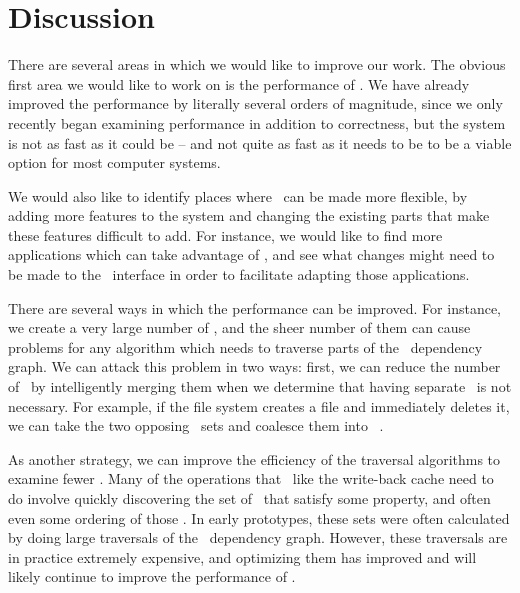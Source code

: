 \section {Discussion}
\label{sec:discussion}

There are several areas in which we would like to improve our work. The obvious
first area we would like to work on is the performance of \Kudos. We have
already improved the performance by literally several orders of magnitude, since
we only recently began examining performance in addition to correctness, but the
system is not as fast as it could be -- and not quite as fast as it needs to be
to be a viable option for most computer systems.

We would also like to identify places where \Kudos\ can be made more flexible,
by adding more features to the system and changing the existing parts that make
these features difficult to add. For instance, we would like to find more
applications which can take advantage of \opgroups, and see what changes might
need to be made to the \opgroup\ interface in order to facilitate adapting those
applications.

There are several ways in which the performance can be improved. For instance,
we create a very large number of \chdescs, and the sheer number of them can
cause problems for any algorithm which needs to traverse parts of the \chdesc\
dependency graph. We can attack this problem in two ways: first, we can reduce
the number of \chdescs\ by intelligently merging them when we determine that
having separate \chdescs\ is not necessary. For example, if the file system
creates a file and immediately deletes it, we can take the two opposing
\chdesc\ sets and coalesce them into \anoop\ \chdesc.

As another strategy, we can improve the efficiency of the traversal algorithms
to examine fewer \chdescs. Many of the operations that \modules\ like the
write-back cache need to do involve quickly discovering the set of \chdescs\
that satisfy some property, and often even some ordering of those \chdescs. In
early prototypes, these sets were often calculated by doing large traversals of
the \chdesc\ dependency graph. However, these traversals are in practice
extremely expensive, and optimizing them has improved and will likely continue
to improve the performance of \Kudos.

